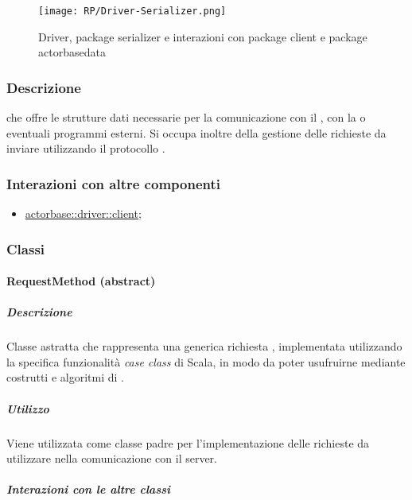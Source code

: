\documentclass{scalatekids-article}
\begin{document}
\begin{figure}[H]
  \begin{center}
    \texttt{[image: RP/Driver-Serializer.png]}
    \caption{Driver, package serializer e interazioni con package client e package actorbasedata}
  \end{center}
\end{figure}

\subsubsection{Descrizione}

 che offre le strutture dati necessarie per la comunicazione con
il , con la  o eventuali programmi esterni. Si occupa
inoltre della gestione delle richieste  da inviare utilizzando il
protocollo .

\subsubsection{Interazioni con altre componenti}
\begin{itemize}
\item \hyperref[sec:actorbase::driver::client]{actorbase::driver::client};
\end{itemize}

\subsubsection{Classi}

\paragraph{RequestMethod (abstract)}
\label{sec:actorbase::driver::client::api::RequestMethod}

\subparagraph{Descrizione}

Classe astratta che rappresenta una generica richiesta ,
implementata utilizzando la specifica funzionalità \textit{case class} di Scala,
in modo da poter usufruirne mediante costrutti e algoritmi di .

\subparagraph{Utilizzo}

Viene utilizzata come classe padre per l'implementazione delle richieste
 da utilizzare nella comunicazione con il server.

\subparagraph{Interazioni con le altre classi}
\end{document}
